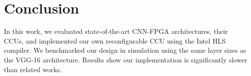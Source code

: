 \chapter{Conclusion}
In this work, we evaluated state-of-the-art CNN-FPGA architectures, their CCUs, and implemented our own reconfigurable CCU using the Intel HLS compiler. We benchmarked our design in simulation using the same layer sizes as the VGG-16 architecture. Results show our implementation is significantly slower than related works.